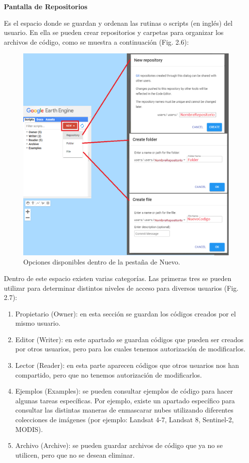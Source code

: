 \documentclass[
  12pt,
  letterpaper,
  twoside]{book}
\providecommand{\tightlist}{%
  \setlength{\itemsep}{0pt}\setlength{\parskip}{0pt}}
\begin{document}
\textbf{Pantalla de Repositorios}

Es el espacio donde se guardan y ordenan las rutinas o scripts (en inglés) del usuario. En ella se pueden crear repositorios y carpetas para organizar los archivos de código, como se muestra a continuación (Fig. 2.6):

\begin{figure}[btp]

{\centering \includegraphics[width=0.8\linewidth]{Img/repofolderfile} 

}

\caption{Opciones disponibles dentro de la pestaña de Nuevo.}\label{fig:unnamed-chunk-7}
\end{figure}

Dentro de este espacio existen varias categorías. Las primeras tres se pueden utilizar para determinar distintos niveles de acceso para diversos usuarios (Fig. 2.7):

\begin{enumerate}
\def\labelenumi{\arabic{enumi}.}
\tightlist
\item
  Propietario (Owner): en esta sección se guardan los códigos creados por el mismo usuario.
\item
  Editor (Writer): en este apartado se guardan códigos que pueden ser creados por otros usuarios, pero para los cuales tenemos autorización de modificarlos.
\item
  Lector (Reader): en esta parte aparecen códigos que otros usuarios nos han compartido, pero que no tenemos autorización de modificarlos.
\item
  Ejemplos (Examples): se pueden consultar ejemplos de código para hacer algunas tareas específicas. Por ejemplo, existe un apartado específico para consultar las distintas maneras de enmascarar nubes utilizando diferentes colecciones de imágenes (por ejemplo: Landsat 4-7, Landsat 8, Sentinel-2, MODIS).
\item
  Archivo (Archive): se pueden guardar archivos de código que ya no se utilicen, pero que no se desean eliminar.
\end{enumerate}
\end{document}
